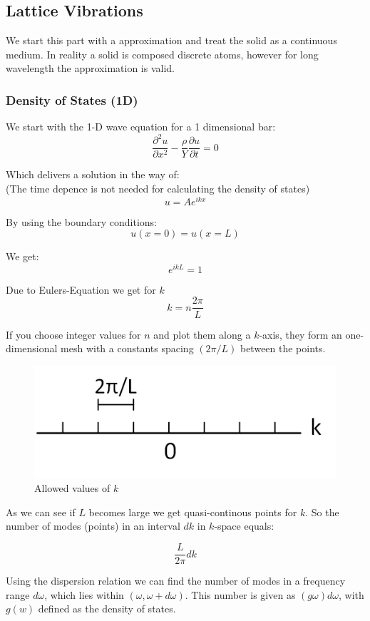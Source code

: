 \subsection{Lattice Vibrations} \label{chap3}
We start this part with a approximation and treat the solid as a continuous medium.
In reality a solid is composed discrete atoms, however for long wavelength the 
approximation is valid.

\subsubsection*{Density of States (1D)}

We start with the 1-D wave equation for a 1 dimensional bar:
$$\frac{\partial^2 u}{\partial x^2} - \frac{\rho}{Y} \frac{\partial u}{\partial t} = 0$$

Which delivers a solution in the way of:\\
(The time depence is not needed for calculating the density of states)
\begin{equation}
    u = Ae^{ikx}
    \label{eq:sol_1d_wave}
\end{equation}

By using the boundary conditions:
$$u(x=0) = u(x=L)$$

We get:
$$e^{ikL} = 1$$

Due to Eulers-Equation we get for $k$
$$k = n \frac{2\pi}{L}$$

If you choose integer values for $n$ and plot them along a $k$-axis, they form
an one-dimensional mesh with a constants spacing $(2\pi/L)$ between the points.

\begin{figure}[H]
	\centering
	\includegraphics[width=0.4\linewidth]{Graphics/Chapter3/allowed_values_k_1D}
	\caption{Allowed values of $k$}
	\label{}
\end{figure}

As we can see if $L$ becomes large we get quasi-continous points for $k$. So the 
number of modes (points) in an interval $dk$ in $k$-space equals:

$$\dfrac{L}{2\pi} dk$$

Using the dispersion relation we can find the number of modes in a frequency
range $d\omega$, which lies within $(\omega, \omega + d\omega)$.
This number is given as $(g\omega)d\omega$, with
$g(w)$ defined as the density of states.


